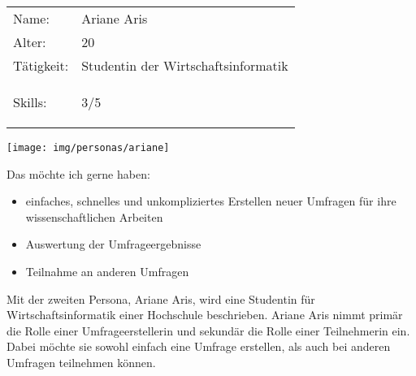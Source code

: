 \newcommand{\ariane}{Ariane Aris\xspace}
%
\newpage
\cvsect{\ariane}
\begin{minipage}[t]{0.5\textwidth}
	\vspace{-3.6cm}
	\renewcommand{\arraystretch}{1.5}
	\begin{tabular}{l l}
		Name: & \ariane \\
		Alter: & 20 \\
		Tätigkeit: & Studentin der Wirtschaftsinformatik \\
		Skills: & 3/5 \hspace{-1cm} \begin{barchart}{5.0}
			\baritemNL{}{3}
		\end{barchart} \\
	\end{tabular}
\end{minipage}
\hfill
\begin{minipage}[t]{0.4\textwidth}
	\flushright
	\texttt{[image: img/personas/ariane]}
\end{minipage}
\autocite{rf-unsplash-studentin}

Das möchte ich gerne haben:
\begin{itemize}
	\item einfaches, schnelles und unkompliziertes Erstellen neuer Umfragen für ihre wissenschaftlichen Arbeiten
	\item Auswertung der Umfrageergebnisse
    \item Teilnahme an anderen Umfragen
\end{itemize}

Mit der zweiten Persona, \ariane, wird eine Studentin für Wirtschaftsinformatik einer Hochschule beschrieben.
\ariane nimmt primär die Rolle einer Umfrageerstellerin und sekundär die Rolle einer Teilnehmerin ein.
Dabei möchte sie sowohl einfach eine Umfrage erstellen, als auch bei anderen Umfragen teilnehmen können.
